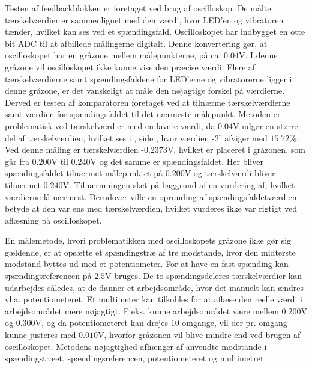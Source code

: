 Testen af feedbackblokken er foretaget ved brug af oscilloskop. De målte tærskelværdier er sammenlignet med den værdi, hvor LED'en og vibratoren tænder, hvilket kan ses ved et spændingsfald. Oscilloskopet har indbygget en otte bit ADC til at afbillede målingerne digitalt. Denne konvertering gør, at oscilloskopet har en gråzone mellem målepunkterne, på ca. $0.04$V. I denne gråzone vil oscilloskopet ikke kunne vise den præcise værdi. Flere af tærskelværdierne samt spændingsfaldene for LED'erne og vibratorerne ligger i denne gråzone, er det vanskeligt at måle den nøjagtige forskel på værdierne. Derved er testen af komparatoren foretaget ved at tilnærme tærskelværdierne samt værdien for spændingsfaldet til det nærmeste målepunkt. Metoden er problematisk ved tærskelværdier med en lavere værdi, da $0.04$V udgør en større del af tærskelværdien, hvilket ses i , side \pageref{Tab:test-taendsluk}, hvor værdien -$2^{\circ}$ afviger med $15.72$\%. Ved denne måling er tærskelværdien -$0.2373$V, hvilket er placeret i gråzonen, som går fra $0.200$V til $0.240$V og det samme er spændingsfaldet. Her bliver spændingsfaldet tilnærmet målepunktet på $0.200$V og tærskelværdi bliver tilnærmet $0.240$V. Tilnærmningen sket på baggrund af en vurdering af, hvilket værdierne lå nærmest. Derudover ville en oprunding af spændingsfaldetværdien betyde at den var ens med tærskelværdien, hvilket vurderes ikke var rigtigt ved aflæsning på oscilloskopet. 

En målemetode, hvori problematikken med oscilloskopets gråzone ikke gør sig gældende, er at opsætte et spændingstræ af tre modstande, hvor den midterste modstand byttes ud med et potentiometer. For at have en fast spænding kan spændingsreferencen på $2.5$V bruges. De to spændingsdeleres tærskelværdier kan udarbejdes således, at de danner et arbejdsområde, hvor det manuelt kan ændres vha. potentiometeret. Et multimeter kan tilkobles for at aflæse den reelle værdi i arbejdsområdet mere nøjagtigt. F.eks. kunne arbejdsområdet være mellem $0.200$V og $0.300$V, og da potentiometeret kan drejes $10$ omgange, vil der pr. omgang kunne justeres med $0.010$V, hvorfor gråzonen vil blive mindre end ved brugen af oscilloskopet. Metodens nøjagtighed afhænger af anvendte modstande i spændingstræet, spændingsreferencen, potentiometeret og multimetret. 

